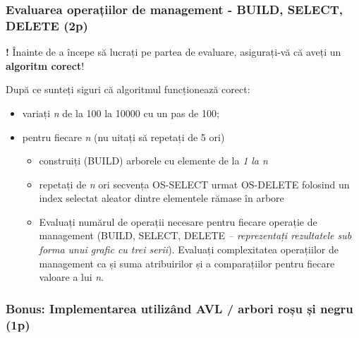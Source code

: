 \documentclass[../ro-fa-lab.tex]{subfiles}
\begin{document}
\subsubsection{Evaluarea operațiilor de management - BUILD, SELECT, DELETE
(2p)}\label{evaluarea-operaux21biilor-de-management---build-select-delete-2p}

\textbf{!} Înainte de a începe să lucrați pe partea de evaluare,
asigurați-vă că aveți un \textbf{algoritm corect}!

După ce sunteți siguri că algoritmul funcționează corect:

\begin{itemize}
\item
  variați \emph{n} de la 100 la 10000 cu un pas de 100;
\item
  pentru fiecare \emph{n} (nu uitați să repetați de 5 ori)

  \begin{itemize}
  \item
    construiți (BUILD) arborele cu elemente de la \emph{1 la n}
  \item
    repetați de \emph{n} ori secvența OS-SELECT urmat OS-DELETE folosind
    un index selectat aleator dintre elementele rămase în arbore
  \item
    Evaluați numărul de operații necesare pentru fiecare operație de
    management (BUILD, SELECT, DELETE \emph{-- reprezentați rezultatele
    sub forma unui grafic cu trei serii}). Evaluați complexitatea
    operațiilor de management ca și suma atribuirilor și a comparațiilor
    pentru fiecare valoare a lui \emph{n}.
  \end{itemize}
\end{itemize}

\subsubsection{Bonus: Implementarea utilizând AVL / arbori roșu și negru
(1p)}\label{bonus-implementarea-utilizuxe2nd-avl-arbori-roux219u-ux219i-negru-1p}
\end{document}
